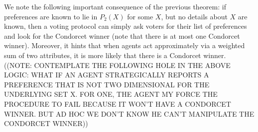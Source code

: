 \documentclass[12pt]{article}
\newcommand{\1}[1]{\mathds{1}[{#1}]}
\begin{document}
  We note the following important consequence of the previous theorem:
  if preferences are known to lie in $P_2(X)$ for some $X$,
  but no details about $X$ are known, then a voting protocol can simply
  ask voters for their list of preferences and look for the Condorcet
  winner (note that there is at most one Condorcet winner).
  Moreover, it hints that when agents act approximately via a weighted
  sum of two attributes, it is more likely that there is a Condorcet winner.
  ((NOTE: CONTEMPLATE THE FOLLOWING HOLE IN THE ABOVE LOGIC:
  WHAT IF AN AGENT STRATEGICALLY REPORTS A PREFERENCE THAT IS NOT TWO
  DIMENSIONAL FOR THE UNDERLYING SET X. FOR ONE, THE AGENT MY FORCE THE
  PROCEDURE TO FAIL BECAUSE IT WON'T HAVE A CONDORCET WINNER. BUT AD HOC 
  WE DON'T KNOW HE CAN'T MANIPULATE THE CONDORCET WINNER))
\end{document}
